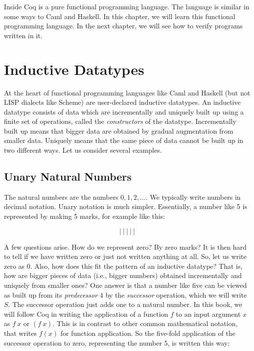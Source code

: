 \documentclass{book}[12pt]
\begin{document}
Inside Coq is a pure functional programming language.  The language
is similar in some ways to Caml and Haskell.  In this chapter, we
will learn this functional programming language.  In the next chapter,
we will see how to verify programs written in it.

\section{Inductive Datatypes}

At the heart of functional programming languages like Caml and Haskell
(but not LISP dialects like Scheme) are user-declared inductive
datatypes.  An inductive datatype consists of data which are
incrementally and uniquely built up using a finite set of operations,
called the \emph{constructors} of the datatype.  Incrementally built
up means that bigger data are obtained by gradual augmentation from
smaller data.  Uniquely means that the same piece of data cannot be
built up in two different ways.  Let us consider several examples.

\subsection{Unary Natural Numbers}

The natural numbers are the numbers $0,1,2,\ldots$.  We typically
write numbers in decimal notation.  Unary notation is much simpler.
Essentially, a number like 5 is represented by making 5 marks, for
example like this:

\[ |\ |\ |\ |\ | \]

\noindent A few questions arise.  How do we represent zero?  By zero
marks?  It is then hard to tell if we have written zero or just not
written anything at all.  So, let us write zero as $0$.  Also, how
does this fit the pattern of an inductive datatype?  That is, how are
bigger pieces of data (i.e., bigger numbers) obtained incrementally
and uniquely from smaller ones?  One answer is that a number like five
can be viewed as built up from its \emph{predecessor} 4 by the
\emph{successor} operation, which we will write $S$.  The successor
operation just adds one to a natural number.  In this book, we will
follow Coq in writing the application of a function $f$ to an input
argument $x$ as $f\ x$ or $(f\ x)$.  This is in contrast to other
common mathematical notation, that writes $f(x)$ for function
application.  So the five-fold application of the successor operation
to zero, representing the number 5, is written this way:
\end{document}
